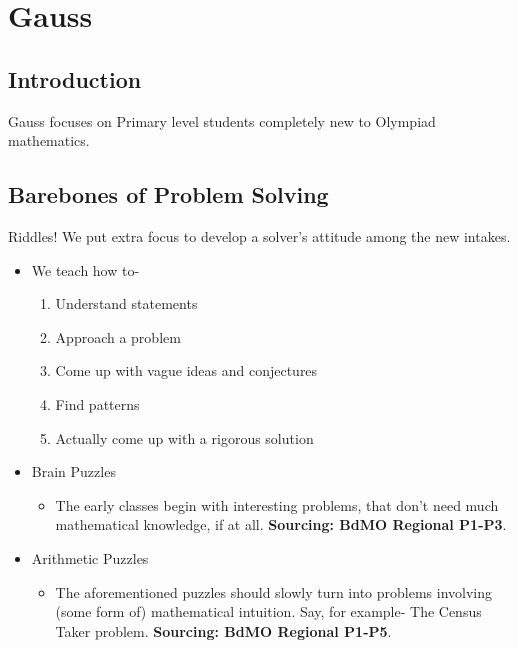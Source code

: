 \documentclass[oneside]{book}
\begin{document}
\chapter{Gauss}
\section{Introduction}
    Gauss focuses on Primary level students completely new to Olympiad mathematics.

\section{Barebones of Problem Solving}
Riddles! We put extra focus to develop a solver's attitude among the new intakes.
\begin{itemize}
    \item We teach how to-
     \begin{enumerate}
        \item Understand statements
        \item Approach a problem
        \item Come up with vague ideas and conjectures
        \item Find patterns
        \item Actually come up with a rigorous solution
     \end{enumerate}
     
    \item Brain Puzzles
     \begin{itemize}
        \item The early classes begin with interesting problems, that don't need much mathematical  knowledge, if at all. \textbf{Sourcing: BdMO Regional P1-P3}.
     \end{itemize}
    
    \item Arithmetic Puzzles
     \begin{itemize}
         \item The aforementioned puzzles should slowly turn into problems involving (some form of) mathematical intuition. Say, for example- The Census Taker problem. \textbf{Sourcing: BdMO Regional P1-P5}.
     \end{itemize}
\end{itemize}
\end{document}
